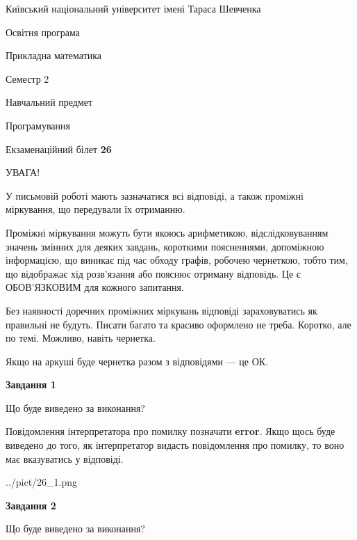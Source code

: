 \documentclass[12pt, ukrainian]{article}
\begin{document}
{{\begin {small}\par
{ \center  Київський національний університет імені Тараса Шевченка \par}
{\parbox {5 cm}{Освітня програма \hfill}{\parbox {7 cm}{Прикладна математика \hfill}}\parbox {6 cm}{\hfill Семестр 2}}\par
{\parbox {5 cm} {Навчальний предмет \hfill}\parbox {7 cm}{Програмування \hfill}\parbox {6cm}{\hfill}\par}\vspace{-7pt} \end{small}}{\center Екзаменаційний білет \No \textbf
{ 26 }\par}}
{
\begin {large}
УВАГА!

У письмовій роботі мають зазначатися всі відповіді, а також проміжні міркування, що передували їх отриманню.

Проміжні міркування можуть бути якоюсь арифметикою, відслідковуванням зна\-чень змінних для деяких завдань,
короткими поясненнями, допоміжною інформацією, що виникає під час обходу графів, робочею чернеткою,
тобто тим, що відображає хід розв’язання або пояснює отриману відповідь.
Це є ОБОВ’ЯЗКОВИМ для кожного запитання.

Без наявності доречних проміжних міркувань відповіді зараховуватись як правиль\-ні не будуть.
Писати багато та красиво оформлено не треба. Коротко, але по темі. Можли\-во, навіть чернетка.

Якщо на аркуші буде чернетка разом з відповідями --- це ОК.

\newpage

{\begin {center}\textbf{Завдання 1}\end {center}}\par
Що буде виведено за виконання?

Повідомлення інтерпретатора про помилку позначати \textbf{error}.
Якщо щось буде виведено до того, як інтерпретатор видасть повідомлення про помилку, 
то воно має вказуватись у відповіді. \par


\begin{center}
	{../pict/26_1.png}
\end{center}
\newpage

{\begin {center}\textbf{Завдання 2}\end {center}}\par
Що буде виведено за виконання?


\end{large}}
\end{document}
